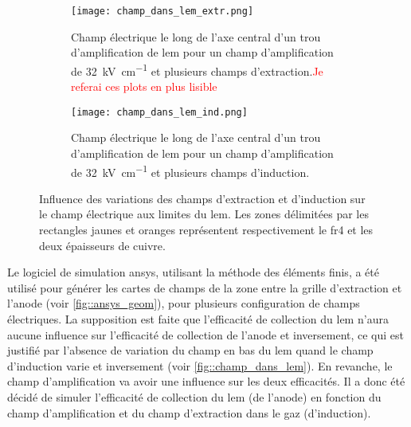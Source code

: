       \begin{figure}[htpb]
        \begin{subfigure}[t]{0.48\textwidth}
          \texttt{[image: champ\_dans\_lem\_extr.png]}
          \caption{\label{fig::champ_dans_lem_extr}Champ électrique le long de l'axe central d'un trou d'amplification de \gls{lem} pour un champ d'amplification de \SI{32}{\kilo\volt\per\centi\meter} et plusieurs champs d'extraction.\textcolor{red}{Je referai ces plots en plus lisible}}
        \end{subfigure}
        \hfill
        \begin{subfigure}[t]{0.48\textwidth}
          \texttt{[image: champ\_dans\_lem\_ind.png]}
          \caption{\label{fig::champ_dans_lem_ind}Champ électrique le long de l'axe central d'un trou d'amplification de \gls{lem} pour un champ d'amplification de \SI{32}{\kilo\volt\per\centi\meter} et plusieurs champs d'induction.}
        \end{subfigure}
        \caption[Influence des variations des champs d'extraction et d'induction sur le champ électrique aux limites du \gls{lem}.]{\label{fig::champ_dans_lem}Influence des variations des champs d'extraction et d'induction sur le champ électrique aux limites du \gls{lem}. Les zones délimitées par les rectangles jaunes et oranges représentent respectivement le \gls{fr4} et les deux épaisseurs de cuivre.}
      \end{figure}
      
      Le logiciel de simulation \gls{ansys}, utilisant la méthode des éléments finis, a été utilisé pour générer les cartes de champs de la zone entre la grille d'extraction et l'anode (voir \autoref{fig::ansys_geom}), pour plusieurs configuration de champs électriques. La supposition est faite que l'efficacité de collection du \gls{lem} n'aura aucune influence sur l'efficacité de collection de l'anode et inversement, ce qui est justifié par l'absence de variation du champ en bas du \gls{lem} quand le champ d'induction varie et inversement (voir \autoref{fig::champ_dans_lem}). En revanche, le champ d'amplification va avoir une influence sur les deux efficacités. Il a donc été décidé de simuler l'efficacité de collection du \gls{lem} (de l'anode) en fonction du champ d'amplification et du champ d'extraction dans le gaz (d'induction).
            
